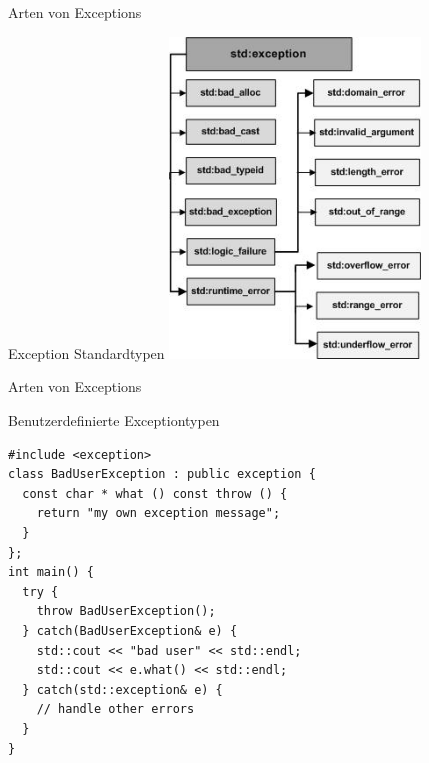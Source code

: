 \documentclass[presentation]{beamer}
\begin{document}
\begin{frame}[fragile,label=sec-1-1]{Arten von Exceptions}
\begin{block}{Exception Standardtypen}
	\centering
	\includegraphics[width=0.5\textwidth]{img/exceptions.jpg}
\end{block}

\end{frame}

\begin{frame}[fragile,label=sec-1-1]{Arten von Exceptions}
\begin{exampleblock}{Benutzerdefinierte Exceptiontypen}
\begin{verbatim}
#include <exception>
class BadUserException : public exception {
  const char * what () const throw () {
    return "my own exception message";
  }
};
int main() {
  try {
    throw BadUserException();
  } catch(BadUserException& e) {
    std::cout << "bad user" << std::endl;
    std::cout << e.what() << std::endl;
  } catch(std::exception& e) {
	// handle other errors
  }
}
\end{verbatim}
\end{exampleblock}

\end{frame}
\end{document}
